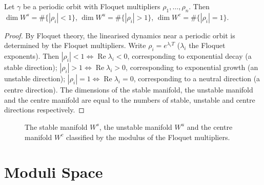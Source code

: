 \begin{proposition}\label{prop:stable_floquet}
Let $\gamma$ be a periodic orbit with Floquet multipliers $\rho_1, \dots, \rho_n$. Then $\dim W^s = \#\{|\rho_i| < 1\}$, $\dim W^u = \#\{|\rho_i| > 1\}$, $\dim W^c = \#\{|\rho_i| = 1\}$.
\end{proposition}

\begin{proof}
By Floquet theory, the linearised dynamics near a periodic orbit is determined by the Floquet multipliers. Write $\rho_i = e^{\lambda_i T}$ ($\lambda_i$ the Floquet exponents). Then $|\rho_i| < 1 \iff \operatorname{Re}\lambda_i < 0$, corresponding to exponential decay (a stable direction); $|\rho_i| > 1 \iff \operatorname{Re}\lambda_i > 0$, corresponding to exponential growth (an unstable direction); $|\rho_i| = 1 \iff \operatorname{Re}\lambda_i = 0$, corresponding to a neutral direction (a centre direction). The dimensions of the stable manifold, the unstable manifold and the centre manifold are equal to the numbers of stable, unstable and centre directions respectively.
\end{proof}

\begin{figure}[htbp]
\centering
{}
\caption{The stable manifold $W^s$, the unstable manifold $W^u$ and the centre manifold $W^c$ classified by the modulus of the Floquet multipliers.}
\label{fig:stable_manifolds}
\end{figure}

\section{Moduli Space}

